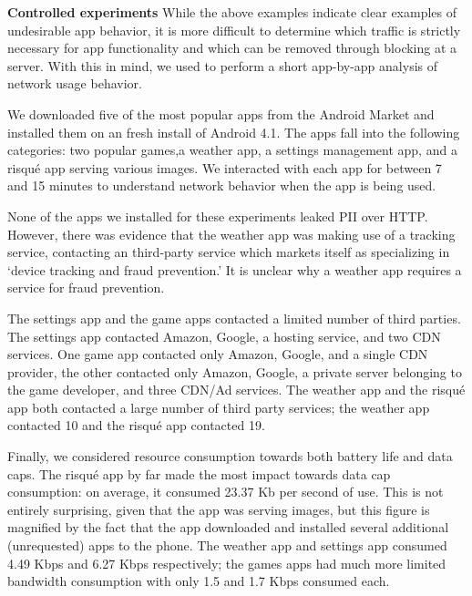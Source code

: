 \noindent\textbf{Controlled experiments} While the above examples indicate clear examples of undesirable app behavior, 
it is more difficult to determine which traffic is strictly necessary for app functionality and which can be removed through blocking 
at a \meddle server. 
    With this in mind, we used \meddle to perform a short app-by-app analysis of network usage behavior.
    
       We downloaded five of the most popular apps from the Android Market and installed them on an fresh install of Android 4.1.
       The apps fall into the following categories: two popular games,a weather app, a settings 
        management app, and a risqu\'{e} app serving various images. We interacted with each app for between 7 and 15 minutes 
        to understand network behavior when the app is being used.

    None of the apps we installed for these experiments leaked PII over HTTP. However, there was evidence that the weather app was making use of a tracking service, contacting an third-party service which markets itself as specializing in `device tracking and fraud prevention.'
    It is unclear why a weather app requires a service for fraud prevention.

    The settings app and the game apps contacted a limited number of third parties.
    The settings app contacted Amazon, Google, a hosting service, and two CDN services.
    One game app contacted only Amazon, Google, and a single CDN provider, the other contacted only Amazon, Google, a private server belonging to the game developer, and three CDN/Ad services.
    The weather app and the risqu\'{e} app both contacted a large number of third party services; the weather app contacted 10 and the risqu\'{e} app contacted 19. 

   Finally, we considered resource consumption towards both battery life and data caps.
    The risqu\'{e} app by far made the most impact towards data cap consumption: on average, it consumed 23.37 Kb per second of use.
    This is not entirely surprising, given that the app was serving images, but this figure is magnified by the fact that the app downloaded and installed several additional (unrequested) apps to the phone.
    The weather app and settings app consumed 4.49 Kbps and 6.27 Kbps respectively; the games apps had much more limited bandwidth consumption with only 1.5 and 1.7 Kbps consumed each.

